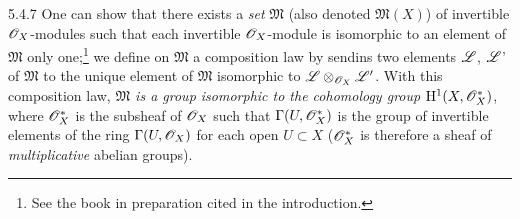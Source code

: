 \begin{env}{5.4.7}
\label{env-0.5.4.7}
One can show that there exists a \emph{set} $\mathfrak{M}$ (also denoted $\mathfrak{M}(X)$)
of invertible $\mathscr{O}_X$-modules such that each invertible $\mathscr{O}_X$-module is isomorphic to an
element of $\mathfrak{M}$ only one;\footnote{See the book in preparation cited in the
introduction.} we define on $\mathfrak{M}$ a composition law by sendins two elements
$\mathscr{L}$, $\mathscr{L}$' of $\mathfrak{M}$ to the unique element of $\mathfrak{M}$ isomorphic to
$\mathscr{L}\otimes_{\mathscr{O}_X}\mathscr{L}'$. With this composition law, \emph{$\mathfrak{M}$ is a group
isomorphic to the cohomology group $\mathrm{H}^1(X,\mathscr{O}_X^*)$}, where $\mathscr{O}_X^*$ is the subsheaf of
$\mathscr{O}_X$ such that $\Gamma(U,\mathscr{O}_X^*)$ is the group of invertible elements of the ring
$\Gamma(U,\mathscr{O}_X)$ for each open $U\subset X$ ($\mathscr{O}_X^*$ is therefore a sheaf of
\emph{multiplicative} abelian groups).


\end{env}
